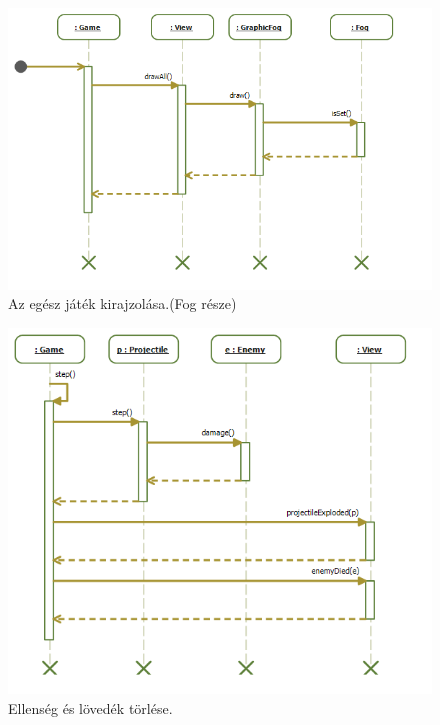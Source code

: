 \begin{figure}[H]
\begin{center}
\includegraphics[width=18cm]{images/grafikaSeq/step6.png}
\caption{Az egész játék kirajzolása.(Fog része)}
\label{fig:Graphic_drawAll_Fog}
\end{center}
\end{figure}

\begin{figure}[H]
\begin{center}
\includegraphics[width=18cm]{images/grafikaSeq/proj_Enemy_del.png}
\caption{Ellenség és lövedék törlése.}
\label{fig:Graphic_enemy/projectile_del}
\end{center}
\end{figure}